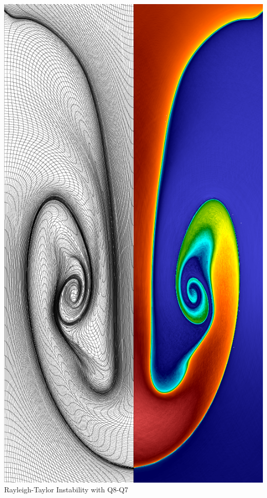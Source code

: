 \documentclass[8pt,xcolor=svgnames]{beamer}
\begin{document}
\begin{frame}
\begin{columns}
\begin{column}{0.30\textwidth}
\begin{center}
\begin{minipage}{0.95\textwidth}
\begin{alertblock}{}
\begin{center}
            \includegraphics[scale = 0.1]{figs/q8q7_RT_density.png} \\
            {\tiny Rayleigh-Taylor Instability with Q8-Q7}
            \end{center}
      \end{alertblock}
    \end{minipage}
  \end{center}
\end{column}
\end{columns}


\end{frame}
\end{document}
